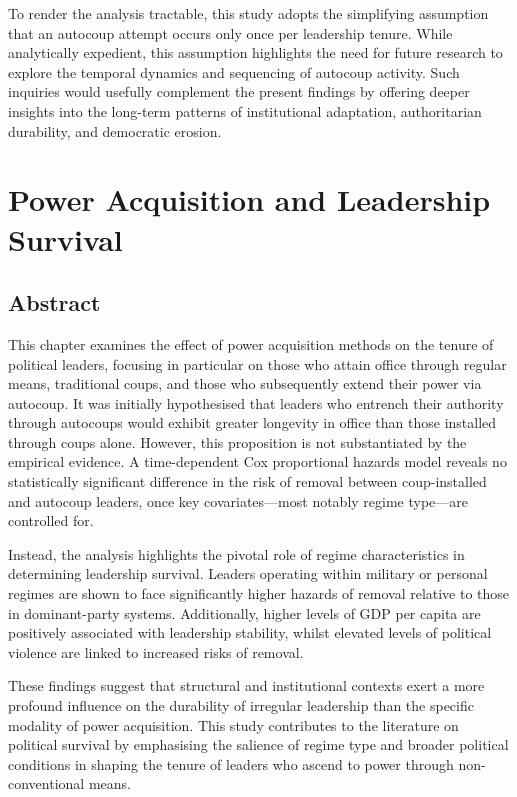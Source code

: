 \documentclass[
  12pt,
]{report}
\begin{document}
To render the analysis tractable, this study adopts the simplifying
assumption that an autocoup attempt occurs only once per leadership
tenure. While analytically expedient, this assumption highlights the
need for future research to explore the temporal dynamics and sequencing
of autocoup activity. Such inquiries would usefully complement the
present findings by offering deeper insights into the long-term patterns
of institutional adaptation, authoritarian durability, and democratic
erosion.

\chapter{Power Acquisition and Leadership
Survival}\label{power-acquisition-and-leadership-survival}

\section*{Abstract}\label{abstract-3}

This chapter examines the effect of power acquisition methods on the
tenure of political leaders, focusing in particular on those who attain
office through regular means, traditional coups, and those who
subsequently extend their power via autocoup. It was initially
hypothesised that leaders who entrench their authority through autocoups
would exhibit greater longevity in office than those installed through
coups alone. However, this proposition is not substantiated by the
empirical evidence. A time-dependent Cox proportional hazards model
reveals no statistically significant difference in the risk of removal
between coup-installed and autocoup leaders, once key covariates---most
notably regime type---are controlled for.

Instead, the analysis highlights the pivotal role of regime
characteristics in determining leadership survival. Leaders operating
within military or personal regimes are shown to face significantly
higher hazards of removal relative to those in dominant-party systems.
Additionally, higher levels of GDP per capita are positively associated
with leadership stability, whilst elevated levels of political violence
are linked to increased risks of removal.

These findings suggest that structural and institutional contexts exert
a more profound influence on the durability of irregular leadership than
the specific modality of power acquisition. This study contributes to
the literature on political survival by emphasising the salience of
regime type and broader political conditions in shaping the tenure of
leaders who ascend to power through non-conventional means.
\end{document}
